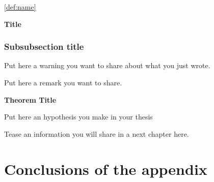 \noindent
\lipsum[2] \ref{def:name}

\begin{eve}
    \lipsum[3]
\end{eve}


\begin{Algorithm}{\textbf{Title}}

    \label{alg:algorithm_name}
 
    \begin{quote}
        \lipsum[4-6]
    \end{quote}

\end{Algorithm}

\subsubsection{Subsubsection title}

\label{sec:subsubsection_name}
\lipsum[10-11]

\begin{warning}
    Put here a warning you want to share about what you just wrote.
\end{warning}

\begin{idea}
   Put here a remark you want to share.
\end{idea}


\begin{theorem}{\textbf{Theorem Title}}
    \label{th:theorem_name}
    \lipsum[7-8]
\end{theorem}


\begin{hypo}
    Put here an hypothesis you make in your thesis
\end{hypo}


\begin{wait}
    Tease an information you will share in a next chapter here.
\end{wait}


\section{Conclusions of the appendix}

\lipsum[1-3]

